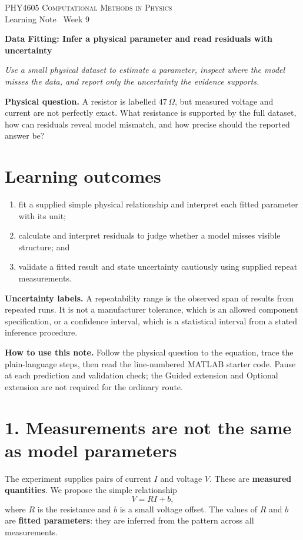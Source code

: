\documentclass[11pt,a4paper]{article}
\newcommand{\course}{PHY4605 Computational Methods in Physics}
\begin{document}
{\large\textsc{\course}}\\[-2pt]
{\small Learning Note \textbar\ Week 9}\par\vspace{4pt}
{\LARGE\bfseries Data Fitting: Infer a physical parameter and read residuals with uncertainty}\par\vspace{3pt}
\textit{Use a small physical dataset to estimate a parameter, inspect where the model misses the data, and report only the uncertainty the evidence supports.}

\begin{keybox}\textbf{Physical question.} A resistor is labelled $47\,\Omega$, but measured voltage and current are not perfectly exact. What resistance is supported by the full dataset, how can residuals reveal model mismatch, and how precise should the reported answer be?\end{keybox}

\section*{Learning outcomes}
\begin{enumerate}[nosep,leftmargin=5mm]
\item fit a supplied simple physical relationship and interpret each fitted parameter with its unit;
\item calculate and interpret residuals to judge whether a model misses visible structure; and
\item validate a fitted result and state uncertainty cautiously using supplied repeat measurements.
\end{enumerate}

\textbf{Uncertainty labels.} A repeatability range is the observed span of results from repeated runs. It is not a manufacturer tolerance, which is an allowed component specification, or a confidence interval, which is a statistical interval from a stated inference procedure.

\textbf{How to use this note.} Follow the physical question to the equation, trace the plain-language steps, then read the line-numbered MATLAB starter code. Pause at each prediction and validation check; the Guided extension and Optional extension are not required for the ordinary route.

\section*{1. Measurements are not the same as model parameters}
The experiment supplies pairs of current $I$ and voltage $V$. These are \textbf{measured quantities}. We propose the simple relationship
\[
V=RI+b,
\]
where $R$ is the resistance and $b$ is a small voltage offset. The values of $R$ and $b$ are \textbf{fitted parameters}: they are inferred from the pattern across all measurements.
\end{document}
